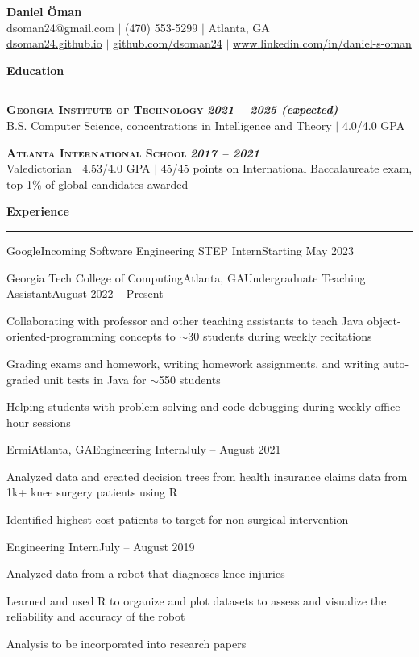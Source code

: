 \documentclass{article}
\newcommand{\horizontal}{\vspace{3pt}\hrule}
\newcommand{\school}[3]{\vspace{3pt}\textsc{\textbf{#1}} \hfill \textbf{\textit{#2}} \\ #3}
\newcommand{\sectitle}[1]{\vspace{3pt} \textbf{\large #1} \horizontal}
\begin{document}
\thispagestyle{empty}
\begin{center}
    \textbf{\LARGE Daniel Öman} \\
    dsoman24@gmail.com $|$ (470) 553-5299 $|$ Atlanta, GA \\
    \href{https://dsoman24.github.io/}{dsoman24.github.io} $|$ \href{https://github.com/dsoman24}{github.com/dsoman24} $|$ \href{https://www.linkedin.com/in/daniel-s-oman/}{www.linkedin.com/in/daniel-s-oman}
\end{center}

\begin{flushleft}
\sectitle{Education}

\school{Georgia Institute of Technology}{2021 -- 2025 (expected)}
{B.S. Computer Science, concentrations in Intelligence and Theory $|$ 4.0/4.0 GPA}

\school{Atlanta International School}{2017 -- 2021}
{Valedictorian $|$ 4.53/4.0 GPA $|$ 45/45 points on International Baccalaureate exam, top 1\% of global candidates awarded}

\sectitle{Experience}

    \begin{experience_no_list}{Google}{}{Incoming Software Engineering STEP Intern}{Starting May 2023}
    \end{experience_no_list}

    \begin{experience}{Georgia Tech College of Computing}{Atlanta, GA}{Undergraduate Teaching Assistant}{August 2022 -- Present}
        \item Collaborating with professor and other teaching assistants to teach Java object-oriented-programming concepts to $\sim$30 students during weekly recitations
        \item Grading exams and homework, writing homework assignments, and writing auto-graded unit tests in Java for $\sim$550 students
        \item Helping students with problem solving and code debugging during weekly office hour sessions
    \end{experience}

    \begin{experience}{Ermi}{Atlanta, GA}{Engineering Intern}{July -- August 2021}
        \item Analyzed data and created decision trees from health insurance claims data from 1k+ knee surgery patients using R
        \item Identified highest cost patients to target for non-surgical intervention
    \end{experience}
    \begin{subexperience}{Engineering Intern}{July -- August 2019}
        \item Analyzed data from a robot that diagnoses knee injuries
        \item Learned and used R to organize and plot datasets to assess and visualize the reliability and accuracy of the robot
        \item Analysis to be incorporated into research papers
    \end{subexperience}


\end{flushleft}
\end{document}
